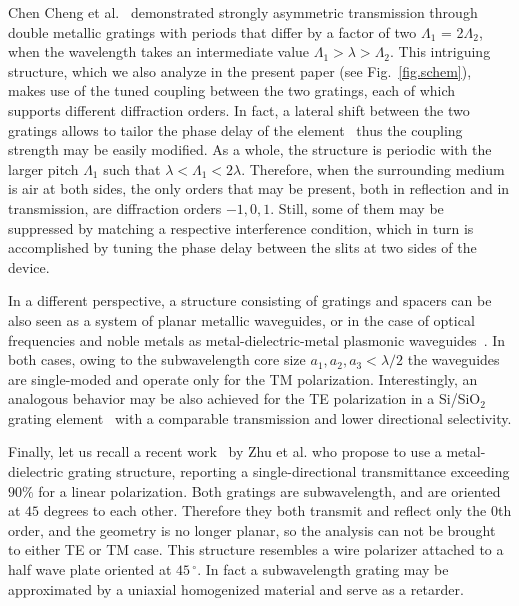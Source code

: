 \documentclass[10pt,letterpaper,twocolumn]{article} %
\begin{document}
 

Chen Cheng et al.~\cite{13,14,17}  demonstrated strongly asymmetric transmission through double metallic gratings with periods that differ by a factor of two $\Lambda_1$ = 2$\Lambda_2$, when the wavelength takes an intermediate value $\Lambda_1 > \lambda >  \Lambda_2$. This intriguing structure, which we also analyze in the present paper (see Fig.~\ref{fig.schem}), makes use of the tuned coupling between the two gratings, each of which supports different diffraction orders. In fact, a lateral shift between the two gratings allows to tailor the phase delay of the element~\cite{15} thus the coupling strength may be easily modified. As a whole, the structure  is periodic with the larger pitch $\Lambda_1$ such that $\lambda <\Lambda_1<2\lambda $. Therefore, when the surrounding medium is air at both sides, the only orders that may be present,  both in reflection and in transmission, are diffraction orders $-1,0,1$. Still, some of them may be suppressed by matching a respective interference condition, which in 
turn is accomplished by tuning the phase delay between the slits at two sides of the device.

In a different perspective, a structure consisting of gratings and spacers can be also seen as a system of planar metallic waveguides, or in the case of optical frequencies and noble metals as metal-dielectric-metal plasmonic waveguides~\cite{2}. In both cases, owing to the subwavelength core size $a_1 , a_2 , a_3<\lambda/2$ the waveguides are single-moded and operate only for the TM polarization. Interestingly, an analogous behavior may be also achieved for the TE polarization in a Si/SiO$_2$ grating element~\cite{16} with a comparable transmission and lower directional selectivity.

Finally, let us recall a recent work~\cite{18}  by Zhu et al. who propose to use a metal-dielectric grating structure, reporting a single-directional transmittance exceeding $90\%$ for a linear polarization. Both gratings are subwavelength, and are oriented at $45$ degrees to each other. 
Therefore they both transmit and reflect only the $0$th order, and the geometry is no longer planar, so the analysis can not be brought to either TE or TM case. This structure resembles a wire polarizer attached to a half wave plate oriented at $45\,^{\circ}$. In fact a subwavelength grating may be approximated by a uniaxial homogenized material and  serve as a retarder.
\end{document}
